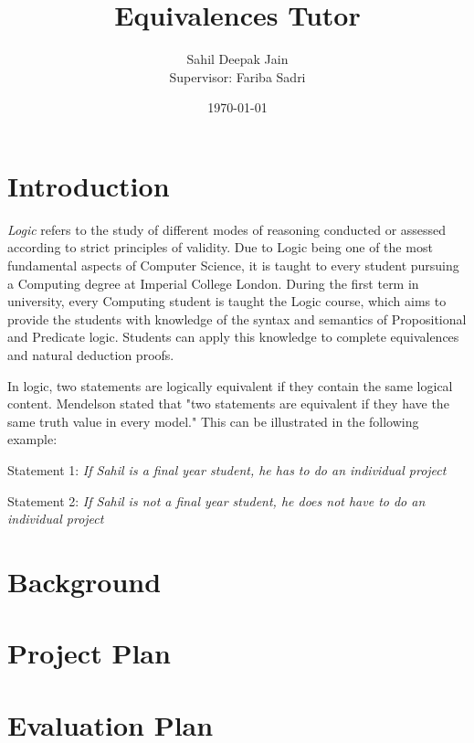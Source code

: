 \documentclass[11pt]{article}
\begin{document}
\title{Equivalences Tutor}

\author{Sahil Deepak Jain \\ Supervisor: Fariba Sadri}
\date{\today}

\maketitle
\newpage

\begin{abstract}

\end{abstract}
\newpage

\tableofcontents

\newpage

\section{Introduction}
\emph{Logic} refers to the study of different modes of reasoning conducted or
assessed according to strict principles of validity. Due to Logic being one of 
the most fundamental aspects of Computer Science, it is taught to every student
pursuing a Computing degree at Imperial College London. During the first term 
in university, every Computing student is taught the Logic course, which aims to
provide the students with knowledge of the syntax and semantics of Propositional 
and Predicate logic. Students can apply this knowledge to complete equivalences
and natural deduction proofs.

In logic, two statements are logically equivalent if they contain the same
logical content. Mendelson stated that "two statements are equivalent if they
have the same truth value in every model." This can be illustrated in the 
following example:

Statement 1: \emph{If Sahil is a final year student, he has to do an individual
project}

Statement 2: \emph{If Sahil is not a final year student, he does not have to do
an individual project}



\newpage

\section{Background}
\newpage

\section{Project Plan}

\newpage

\section{Evaluation Plan}

\newpage
\end{document}
